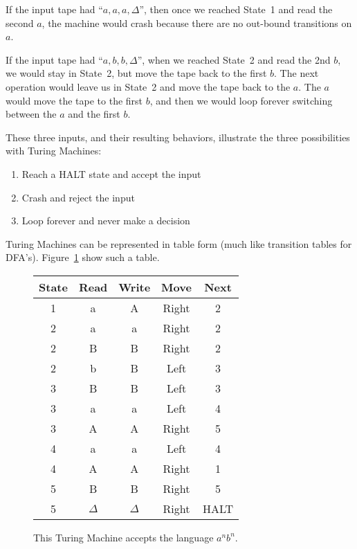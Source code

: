 \documentclass[letterpaper,12pt,openany,reqno]{book}%
\begin{document}
If the input tape had ``$a,a,a,\Delta$'', then once we reached State~1 and read the second $a$, the machine would crash because there are no out-bound transitions on $a$.

If the input tape had ``$a,b,b,\Delta$'', when we reached State~2 and read the 2nd $b$, we would stay in State~2, but move the tape back to the first $b$. The next operation would leave us in State~2 and move the tape back to the $a$. The $a$ would move the tape to the first $b$, and then we would loop forever switching between the $a$ and the first $b$.

These three inputs, and their resulting behaviors, illustrate the three possibilities with Turing Machines:
\begin{enumerate}
\item Reach a HALT state and accept the input
\item Crash and reject the input
\item Loop forever and never make a decision
\end{enumerate}
Turing Machines can be represented in table form (much like transition tables for DFA's). Figure~\ref{F.TM.2} show such a table.
\begin{figure}[hbt]
\centering
\begin{tabular}{|c|c|c|c|c|}
\hline
State & Read & Write & Move & Next \\
\hline
1 & a & A & Right & 2 \\
\hline
2 & a & a & Right & 2 \\
\hline
2 & B & B & Right & 2 \\
\hline
2 & b & B & Left & 3 \\
\hline
3 & B & B & Left & 3 \\
\hline
3 & a & a & Left & 4 \\
\hline
3 & A & A & Right & 5 \\
\hline
4 & a & a & Left & 4 \\
\hline
4 & A & A & Right & 1 \\
\hline
5 & B & B & Right & 5 \\
\hline
5 & $\Delta$ & $\Delta$ & Right & HALT \\
\hline
\end{tabular}
\caption[Turing Machine Table]{This Turing Machine accepts the language $a^nb^n$.}
\label{F.TM.2}
\end{figure}
\end{document}
